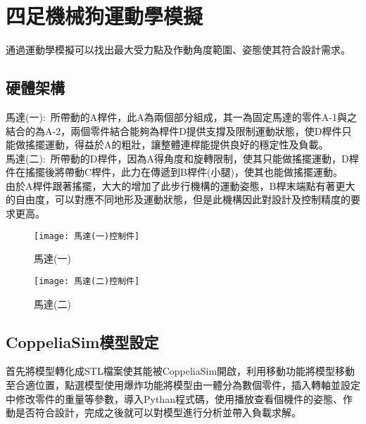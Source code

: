 \chapter{四足機械狗運動學模擬}
通過運動學模擬可以找出最大受力點及作動角度範圍、姿態使其符合設計需求。\\

\section{硬體架構}
馬達(一):\
所帶動的A桿件，此A為兩個部分組成，其一為固定馬達的零件A-1與之結合的為A-2，兩個零件結合能夠為桿件D提供支撐及限制運動狀態，使D桿件只能做搖擺運動，得益於A的粗壯，讓整體連桿能提供良好的穩定性及負載。\\
馬達(二):\
所帶動的D桿件，因為A得角度和旋轉限制，使其只能做搖擺運動，D桿件在搖擺後將帶動C桿件，此力在傳遞到B桿件(小腿)，使其也能做搖擺運動。\\
由於A桿件跟著搖擺，大大的增加了此步行機構的運動姿態，B桿末端點有著更大的自由度，可以對應不同地形及運動狀態，但是此機構因此對設計及控制精度的要求更高。\\

\begin{figure}[htbp]
  \begin{minipage}[t]{0.5\linewidth}
    \centering
    \texttt{[image: 馬達(一)控制件]}
    \caption{馬達(一)}
    \label{馬達(一)控制件}
  \end{minipage}
  \hfill
  \begin{minipage}[t]{0.5\linewidth}
    \centering
    \texttt{[image: 馬達(二)控制件]}
    \caption{馬達(二)}
    \label{馬達(二)控制件}
  \end{minipage}
\end{figure}

\section{CoppeliaSim模型設定}
首先將模型轉化成STL檔案使其能被CoppeliaSim開啟，利用移動功能將模型移動至合適位置，點選模型使用爆炸功能將模型由一體分為數個零件，插入轉軸並設定中修改零件的重量等參數，導入Pythan程式碼，使用播放查看個機件的姿態、作動是否符合設計，完成之後就可以對模型進行分析並帶入負載求解。\


